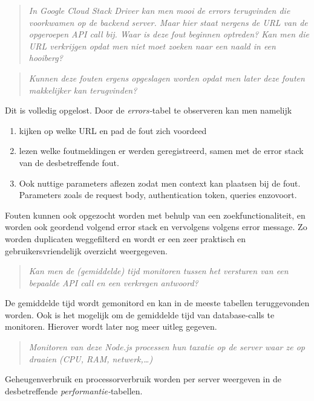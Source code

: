 \begin{quote}
	\textit{In Google Cloud Stack Driver kan men mooi de errors terugvinden die voorkwamen op de backend server. Maar hier staat nergens de URL van de opgeroepen API call bij. Waar is deze fout beginnen optreden? Kan men die URL verkrijgen opdat men niet moet zoeken naar een naald in een hooiberg?}
\end{quote}

\begin{quote}
	\textit{Kunnen deze fouten ergens opgeslagen worden opdat men later deze fouten makkelijker kan terugvinden?}
\end{quote}


Dit is volledig opgelost. Door de \textit{errors-}tabel te observeren kan men namelijk
\begin{enumerate}
	\item kijken op welke URL en pad de fout zich voordeed
	\item lezen welke foutmeldingen er werden geregistreerd, samen met de error stack van de desbetreffende fout.
	\item Ook nuttige parameters aflezen zodat men context kan plaatsen bij de fout. Parameters zoals de request body, authentication token, queries enzovoort.
\end{enumerate}

Fouten kunnen ook opgezocht worden met behulp van een zoekfunctionaliteit, en worden ook geordend volgend error stack en vervolgens volgens error message. Zo worden duplicaten weggefilterd en wordt er een zeer praktisch en gebruikersvriendelijk overzicht weergegeven.

\begin{quote}
	\textit{Kan men de (gemiddelde) tijd monitoren tussen het versturen van een bepaalde API call en een verkregen antwoord?}
\end{quote}

De gemiddelde tijd wordt gemonitord en kan in de meeste tabellen teruggevonden worden. Ook is het mogelijk om de gemiddelde tijd van database-calls te monitoren. Hierover wordt later nog meer uitleg gegeven.

\begin{quote}
	\textit{Monitoren van deze Node.js processen hun taxatie op de server waar ze op draaien (CPU, RAM, netwerk,…)}
\end{quote}

Geheugenverbruik en processorverbruik worden per server weergeven in de desbetreffende \textit{performantie-}tabellen.



